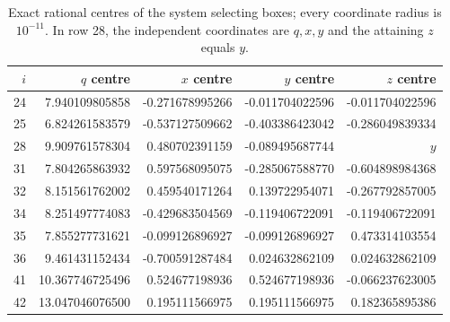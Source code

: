 \begin{table}[htbp]\centering\small
\caption{Exact rational centres of the system selecting boxes; every coordinate radius is $10^{-11}$. In row 28, the independent coordinates are $q,x,y$ and the attaining $z$ equals $y$.}\label{tab:centres}
\begin{tabular}{rrrrr}
\toprule $i$ & $q$ centre & $x$ centre & $y$ centre & $z$ centre\\\midrule
24 & 7.940109805858 & -0.271678995266 & -0.011704022596 & -0.011704022596\\
25 & 6.824261583579 & -0.537127509662 & -0.403386423042 & -0.286049839334\\
28 & 9.909761578304 & 0.480702391159 & -0.089495687744 & $y$\\
31 & 7.804265863932 & 0.597568095075 & -0.285067588770 & -0.604898984368\\
32 & 8.151561762002 & 0.459540171264 & 0.139722954071 & -0.267792857005\\
34 & 8.251497774083 & -0.429683504569 & -0.119406722091 & -0.119406722091\\
35 & 7.855277731621 & -0.099126896927 & -0.099126896927 & 0.473314103554\\
36 & 9.461431152434 & -0.700591287484 & 0.024632862109 & 0.024632862109\\
41 & 10.367746725496 & 0.524677198936 & 0.524677198936 & -0.066237623005\\
42 & 13.047046076500 & 0.195111566975 & 0.195111566975 & 0.182365895386\\
\bottomrule\end{tabular}\end{table}
